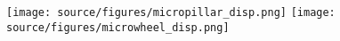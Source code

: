 \begin{figure}
\center
\texttt{[image: source/figures/micropillar\_disp.png]}
\texttt{[image: source/figures/microwheel\_disp.png]}

\end{figure}